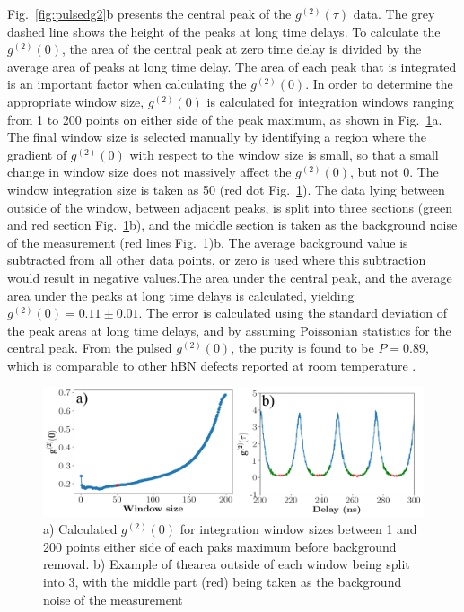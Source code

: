 Fig.~\ref{fig:pulsedg2}b presents the central peak of the $g^{(2)}(\tau)$ data. The grey dashed line shows the height of the peaks at long time delays. To calculate the $g^{(2)}(0)$, the area of the central peak at zero time delay is divided by the average area of peaks at long time delay. The area of each peak that is integrated is an important factor when calculating the $g^{(2)}(0)$. In order to determine the appropriate window size, $g^{(2)}(0)$ is calculated for integration windows ranging from 1 to 200 points on either side of the peak maximum, as shown in Fig.~\ref{fig:g2window}a. The final window size is selected manually by identifying a region where the gradient of $g^{(2)}(0)$ with respect to the window size is small, so that a small change in window size does not massively affect the $g^{(2)}(0)$, but not 0. The window integration size is taken as 50 (red dot Fig.~\ref{fig:g2window}). The data lying between outside of the window, between adjacent peaks, is split into three sections (green and red section Fig.~\ref{fig:g2window}b), and the middle section is taken as the background noise of the measurement (red lines Fig.~\ref{fig:g2window})b. The average background value is subtracted from all other data points, or zero is used where this subtraction would result in negative values.The area under the central peak, and the average area under the peaks at long time delays is calculated, yielding $g^{(2)}(0) = 0.11 \pm 0.01$. The error is calculated using the standard deviation of the peak areas at long time delays, and by assuming Poissonian statistics for the central peak. From the pulsed $g^{(2)}(0)$, the purity is found to be $P=0.89$, which is comparable to other hBN defects reported at room temperature \cite{Zeng2022, Grosso2017, Vogl2017}.


\begin{figure}[h!]
    \centering
    \includegraphics[width=1\linewidth]{Figures/g2window.png}
    \caption{a) Calculated $g^{(2)}(0)$ for integration window sizes between 1 and 200 points either side of each paks maximum before background removal. b) Example of thearea outside of each window being split into 3, with the middle part (red) being taken as the background noise of the measurement}
    \label{fig:g2window}
\end{figure}

